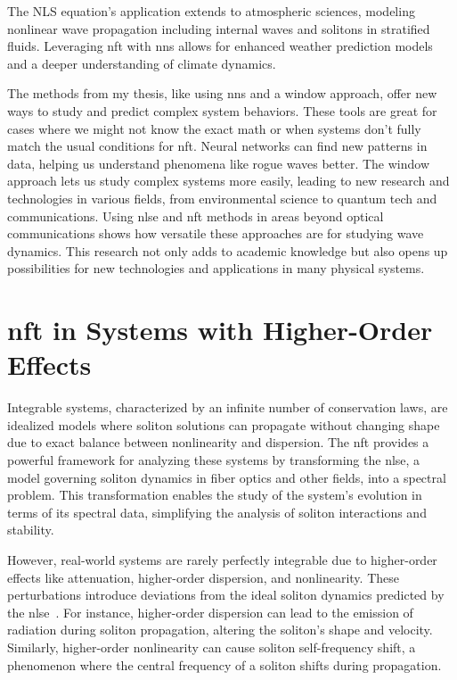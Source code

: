 The NLS equation's application extends to atmospheric sciences, modeling nonlinear wave propagation including internal waves and solitons in stratified fluids. Leveraging \acrshort{nft} with \acrlong{nn}s allows for enhanced weather prediction models and a deeper understanding of climate dynamics.


The methods from my thesis, like using \acrlong{nn}s and a window approach, offer new ways to study and predict complex system behaviors. These tools are great for cases where we might not know the exact math or when systems don't fully match the usual conditions for \acrshort{nft}. Neural networks can find new patterns in data, helping us understand phenomena like rogue waves better. The window approach lets us study complex systems more easily, leading to new research and technologies in various fields, from environmental science to quantum tech and communications.
Using \acrshort{nlse} and \acrshort{nft} methods in areas beyond optical communications shows how versatile these approaches are for studying wave dynamics. This research not only adds to academic knowledge but also opens up possibilities for new technologies and applications in many physical systems.


\section*{\acrlong{nft} in Systems with Higher-Order Effects}


Integrable systems, characterized by an infinite number of conservation laws, are idealized models where soliton solutions can propagate without changing shape due to exact balance between nonlinearity and dispersion. The \acrshort{nft} provides a powerful framework for analyzing these systems by transforming the \acrlong{nlse}, a model governing soliton dynamics in fiber optics and other fields, into a spectral problem. This transformation enables the study of the system's evolution in terms of its spectral data, simplifying the analysis of soliton interactions and stability.

However, real-world systems are rarely perfectly integrable due to higher-order effects like attenuation, higher-order dispersion, and nonlinearity. These perturbations introduce deviations from the ideal soliton dynamics predicted by the \acrshort{nlse}~\cite{karpman1977perturbation}. For instance, higher-order dispersion can lead to the emission of radiation during soliton propagation, altering the soliton's shape and velocity. Similarly, higher-order nonlinearity can cause soliton self-frequency shift, a phenomenon where the central frequency of a soliton shifts during propagation.

